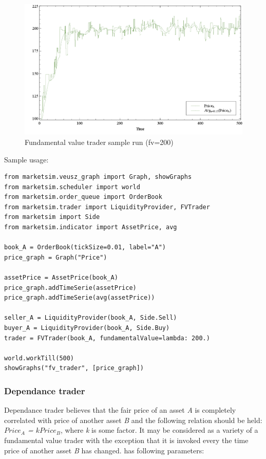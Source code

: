 \documentclass[a4paper,11pt]{article}
\newcommand{\tmtexttt}[1]{{\ttfamily{#1}}}
\begin{document}
\begin{figure}[htbp]
\centering
\includegraphics[width=1\linewidth]{Figures/FVTrader.PNG}
\caption{Fundamental value trader sample run (fv=200)}
\label{fig:FVTrader}
\end{figure}

Sample usage:

\begin{verbatim}
from marketsim.veusz_graph import Graph, showGraphs
from marketsim.scheduler import world
from marketsim.order_queue import OrderBook
from marketsim.trader import LiquidityProvider, FVTrader
from marketsim import Side
from marketsim.indicator import AssetPrice, avg

book_A = OrderBook(tickSize=0.01, label="A")
price_graph = Graph("Price")
 
assetPrice = AssetPrice(book_A)
price_graph.addTimeSerie(assetPrice)
price_graph.addTimeSerie(avg(assetPrice))

seller_A = LiquidityProvider(book_A, Side.Sell)
buyer_A = LiquidityProvider(book_A, Side.Buy)
trader = FVTrader(book_A, fundamentalValue=lambda: 200.)

world.workTill(500)
showGraphs("fv_trader", [price_graph])
\end{verbatim}

\subsubsection{Dependance trader}

Dependance trader believes that the fair price of an asset \textit{A} is completely correlated with price of another asset \textit{B} and the following relation should be held: \textit{$Price_{A}$ = $kPrice_B$}, where \textit{k} is some factor. It may be considered as a variety of a fundamental value trader with the exception that it is invoked every the time price of another asset \textit{B} has changed. \tmtexttt{DependanceTrader} has following parameters: 
\end{document}
